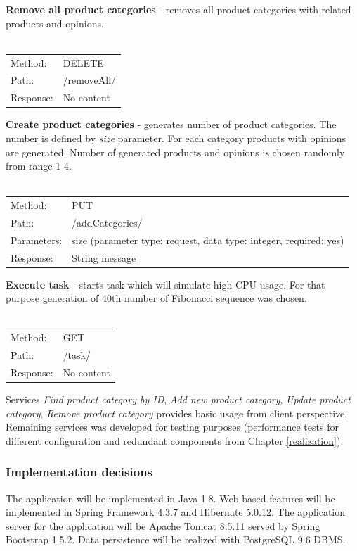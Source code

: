 \documentclass[10pt,a4paper]{article}
\begin{document}
\noindent\textbf{Remove all product categories} - removes all product categories with related products and opinions.\\
\\
  \begin{tabular}{ll}
  Method: & DELETE \\
  Path: & /removeAll/ \\
  Response: & No content  \\
  \end{tabular} \vspace{5mm}
  
\noindent\textbf{Create product categories} - generates number of product categories. The number is defined by \textit{size} parameter. For each category products with opinions are generated. Number of generated products and opinions is chosen randomly from range 1-4. \\
\\
  \begin{tabular}{ll}
  Method: & PUT \\
  Path: & /addCategories/ \\
  Parameters: & size (parameter type: request, data type: integer, required: yes)\\
  Response: & String message  \\
  \end{tabular} \vspace{5mm}

\noindent\textbf{Execute task} - starts task which will simulate high CPU usage. For that purpose generation of 40th number of Fibonacci sequence was chosen. \\
\\
  \begin{tabular}{ll}
  Method: & GET \\
  Path: & /task/ \\
  Response: & No content  \\
  \end{tabular} \vspace{2mm}
  
Services \textit{Find product category by ID}, \textit{Add new product category}, \textit{Update product category}, \textit{Remove product category} provides basic usage from client perspective. Remaining services was developed for testing purposes (performance tests for different configuration and redundant components from Chapter \ref{realization}).
  
\subsubsection{Implementation decisions} 
The application will be implemented in Java 1.8. Web based features will be implemented in Spring Framework 4.3.7 and Hibernate 5.0.12. The application server for the application will be Apache Tomcat 8.5.11 served by Spring Bootstrap 1.5.2. Data persistence will be realized with PostgreSQL 9.6 DBMS.  
\end{document}
